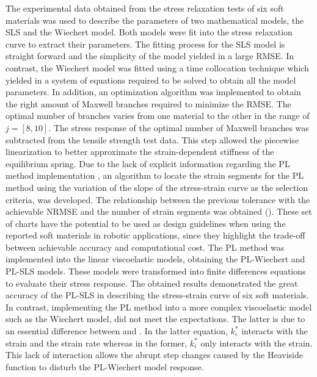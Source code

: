 The experimental data obtained from the stress relaxation tests of six soft materials was used to describe the parameters of two mathematical models, the SLS and the Wiechert model. Both models were fit into the stress relaxation curve to extract their parameters. The fitting process for the SLS model is straight forward and the simplicity of the model yielded in a large RMSE. In contrast, the Wiechert model was fitted using a time collocation technique which yielded in a system of equations required to be solved to obtain all the model parameters. In addition, an optimization algorithm was implemented to obtain the right amount of Maxwell branches required to minimize the RMSE. The optimal number of branches varies from one material to the other in the range of $j=[8,10]$. The stress response of the optimal number of Maxwell branches was subtracted from the tensile strength test data. This step allowed the piecewise linearization to better approximate the strain-dependent stiffness of the equilibrium spring. Due to the lack of explicit information regarding the PL method implementation \cite{austin2015control}, an algorithm to locate the strain segments for the PL method using the variation of the slope of the stress-strain curve as the selection criteria, was developed. The relationship between the previous tolerance with the achievable NRMSE and the number of strain segments was obtained (). These set of charts have the potential to be used as design guidelines when using the reported soft materials in robotic applications, since they highlight the trade-off between achievable accuracy and computational cost. The PL method was implemented into the linear viscoelastic models, obtaining the PL-Wiechert and PL-SLS models. These models were transformed into finite differences equations to evaluate their stress response. The obtained results demonstrated the great accuracy of the PL-SLS in describing the stress-strain curve of six soft materials. In contrast, implementing the PL method into a more complex viscoelastic model such as the Wiechert model, did not meet the expectations. The latter is due to an essential difference between  and . In the latter equation, $k_i^*$ interacts with the strain and the strain rate whereas in the former, $k_i^*$ only interacts with the strain. This lack of interaction allows the abrupt step changes caused by the Heaviside function to disturb the PL-Wiechert model response.


